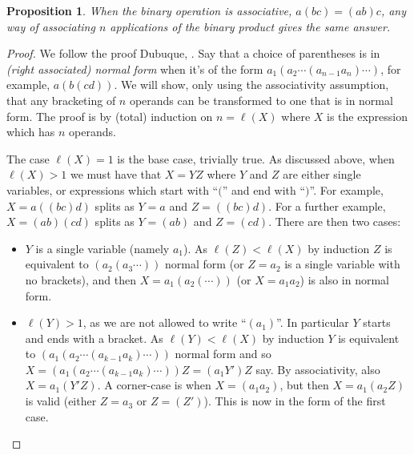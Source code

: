 \documentclass[twoside,a4paper,12pt]{article}
\theoremstyle{plain}
\newtheorem{proposition}{Proposition}[section]
\theoremstyle{definition}
\begin{document}
\begin{proposition}
When the binary operation is associative, $a(bc) = (ab)c$, any way of associating $n$ applications of the binary product gives the same answer.
\end{proposition}
\begin{proof}
We follow the proof Dubuque, \cite{bd}.
Say that a choice of parentheses is in \emph{(right associated) normal form} when it's of the form $a_1 (a_2 \cdots (a_{n-1}a_n) \cdots)$, for example, $a(b(cd))$.  We will show, only using the associativity assumption, that any bracketing of $n$ operands can be transformed to one that is in normal form.  The proof is by (total) induction on $n = \ell(X)$ where $X$ is the expression which has $n$ operands.

The case $\ell(X)=1$ is the base case, trivially true.  As discussed above, when $\ell(X) > 1$ we must have that $X = YZ$ where $Y$ and $Z$ are either single variables, or expressions which start with ``$($'' and end with ``$)$''.  For example, $X = a((bc)d)$ splits as $Y=a$ and $Z=((bc)d)$.  For a further example, $X = (ab)(cd)$ splits as $Y=(ab)$ and $Z=(cd)$.  There are then two cases:
\begin{itemize}
   \item $Y$ is a single variable (namely $a_1$).  As $\ell(Z) < \ell(X)$ by induction $Z$ is equivalent to $(a_2(a_3\cdots))$ normal form (or $Z=a_2$ is a single variable with no brackets), and then $X = a_1(a_2(\cdots))$ (or $X=a_1a_2$) is also in normal form.
   \item $\ell(Y) > 1$, as we are not allowed to write ``$(a_1)$''.  In particular $Y$ starts and ends with a bracket.  As $\ell(Y) < \ell(X)$ by induction $Y$ is equivalent to $(a_1(a_2\cdots(a_{k-1}a_k)\cdots))$ normal form and so $X = (a_1(a_2\cdots(a_{k-1}a_k)\cdots))Z = (a_1 Y')Z$ say.   By associativity, also $X = a_1(Y'Z)$.  A corner-case is when $X=(a_1a_2)$, but then $X = a_1(a_2Z)$ is valid (either $Z = a_3$ or $Z=(Z')$).  This is now in the form of the first case.
\end{itemize}
\end{proof}
\end{document}
